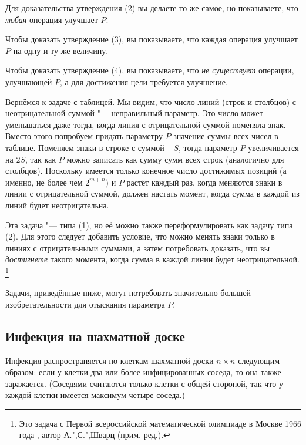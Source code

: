 \documentclass[twoside]{book}
\makeatletter
\newcommand{\rindex}[2][\imki@jobname]{%
  \index[#1]{\detokenize{#2}}%
}
\makeatother
\begin{document}
Для доказательства утверждения (2) вы делаете то же самое, но показываете, что \emph{любая} операция улучшает $P$.

Чтобы доказать утверждение (3), вы показываете, что каждая операция улучшает $P$ на одну и ту же величину.

Чтобы доказать утверждение (4), вы показываете, что \emph{не существует} операции, улучшающей $P$, а для достижения цели требуется улучшение.

\medskip

Вернёмся к задаче с таблицей.
Мы видим, что число линий (строк и столбцов) с неотрицательной суммой "--- неправильный параметр.
Это число может уменьшаться даже тогда, когда линия с отрицательной суммой поменяла знак.
Вместо этого попробуем придать параметру $P$ значение суммы всех чисел в таблице.
Поменяем знаки в строке с суммой $-S$, тогда параметр $P$ увеличивается на $2S$, так как $P$ можно записать как сумму сумм всех строк (аналогично для столбцов).
Поскольку имеется только конечное число достижимых позиций
(а именно, не более чем $2^{m+n}$) и $P$ растёт каждый раз, когда меняются знаки в линии с отрицательной суммой, должен настать момент, когда сумма в каждой из линий будет неотрицательна.

Эта задача "--- типа (1), но её можно также переформулировать как задачу типа (2).
Для этого следует добавить условие, что можно менять знаки только в линиях с отрицательными суммами, а затем потребовать доказать, что вы \emph{достигнете} такого момента, когда сумма в каждой линии будет неотрицательной.%
\footnote{Это задача с Первой всероссийской математической олимпиаде в Москве 1966 года \cite[№7]{ВсМО}, автор А.",С.",Шварц (прим. ред.).}

\medskip

{
\sloppy

Задачи, приведённые ниже, могут потребовать значительно большей изобретательности для отыскания параметра $P$.

}

\subsection*{Инфекция на шахматной доске}%
\rindex{Инфекция на шахматной доске}

Инфекция распространяется по клеткам шахматной доски $n \times n$ следующим образом: если у клетки два или более инфицированных соседа, то она также заражается.
(Соседями считаются только клетки с общей стороной, так что у каждой клетки имеется максимум четыре соседа.)
\end{document}
